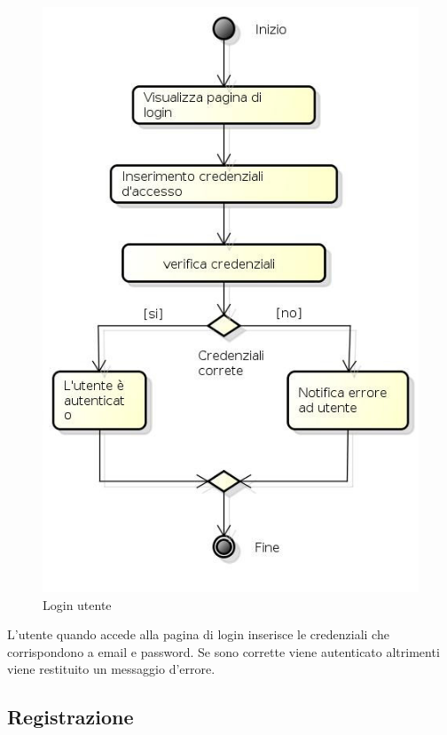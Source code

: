 \begin{figure}[h!]
		\centering
		\includegraphics[scale=.5]{img/attivita/Login.jpg}
		\caption{Login utente}
		\label{fig:Login}
\end{figure}

L'utente quando accede alla pagina di login inserisce le credenziali che corrispondono a email e password. Se sono corrette viene autenticato altrimenti viene restituito un messaggio d'errore.

\newpage

\subsection{Registrazione}

